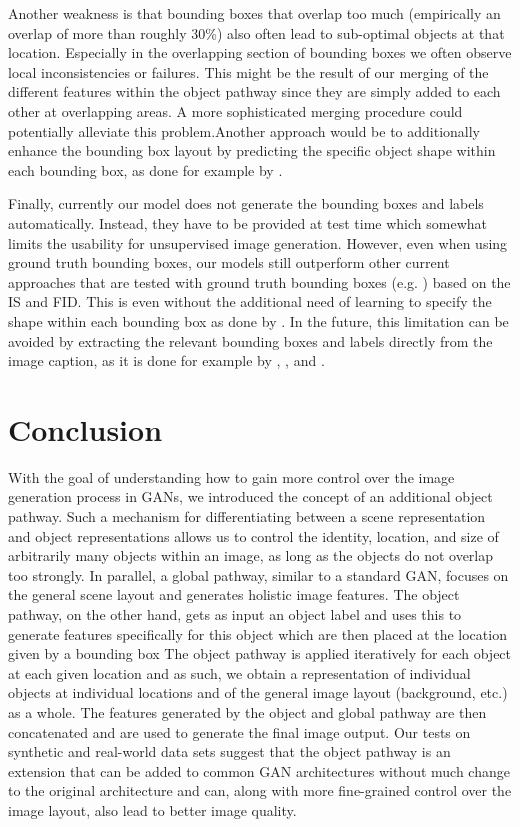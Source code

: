 \documentclass{article} \usepackage{iclr2019_conference,times}
\begin{document}
	Another weakness is that bounding boxes that overlap too much (empirically an overlap of more than roughly 30\%) also often lead to sub-optimal objects at that location.
	Especially in the overlapping section of bounding boxes we often observe local inconsistencies or failures.
	This might be the result of our merging of the different features within the object pathway since they are simply added to each other at overlapping areas.
	A more sophisticated merging procedure could potentially alleviate this problem.Another approach would be to additionally enhance the bounding box layout by predicting the specific object shape within each bounding box, as done for example by \cite{hong2018inferring}.
	
	Finally, currently our model does not generate the bounding boxes and labels automatically.
	Instead, they have to be provided at test time which somewhat limits the usability for unsupervised image generation.
	However, even when using ground truth bounding boxes, our models still outperform other current approaches that are tested with ground truth bounding boxes (e.g. \cite{hong2018inferring}) based on the IS and FID.
	This is even without the additional need of learning to specify the shape within each bounding box as done by \cite{hong2018inferring}.
	In the future, this limitation can be avoided by extracting the relevant bounding boxes and labels directly from the image caption, as it is done for example by \cite{hong2018inferring}, \cite{xu2018deep}, and \cite{tan2018text2scene}.
	
	\section{Conclusion}
	With the goal of understanding how to gain more control over the image generation process in GANs, we introduced the concept of an additional object pathway.
	Such a mechanism for differentiating between a scene representation and object representations allows us to control the identity, location, and size of arbitrarily many objects within an image, as long as the objects do not overlap too strongly.
	In parallel, a global pathway, similar to a standard GAN, focuses on the general scene layout and generates holistic image features.
	The object pathway, on the other hand, gets as input an object label and uses this to generate features specifically for this object which are then placed at the location given by a bounding box
	The object pathway is applied iteratively for each object at each given location and as such, we obtain a representation of individual objects at individual locations and of the general image layout (background, etc.) as a whole.
	The features generated by the object and global pathway are then concatenated and are used to generate the final image output.
	Our tests on synthetic and real-world data sets suggest that the object pathway is an extension that can be added to common GAN architectures without much change to the original architecture and can, along with more fine-grained control over the image layout, also lead to better image quality.
	
\end{document}
